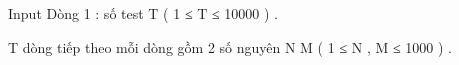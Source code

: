 Input
Dòng 1 : số test T ( 1 ≤ T ≤ 10000 ) .   


   T dòng tiếp theo mỗi dòng gồm 2 số nguyên N M ( 1 ≤ N , M ≤ 1000 ) .